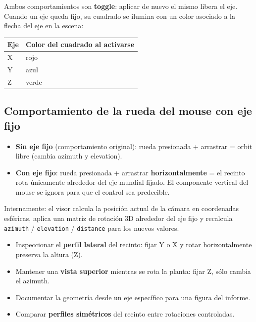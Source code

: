 \documentclass[11pt, a4paper]{article}
\newenvironment{consejo}[1][Consejo]{%
  \begin{tcolorbox}[mybox=cTeal, title={#1}]%
}{\end{tcolorbox}}
\begin{document}
Ambos comportamientos son \textbf{toggle}: aplicar de nuevo el mismo
libera el eje. Cuando un eje queda fijo, su cuadrado se ilumina con un
color asociado a la flecha del eje en la escena:

\vspace{0.3em}
\begin{tabular}{ll}
  \toprule
  \textbf{Eje} & \textbf{Color del cuadrado al activarse} \\
  \midrule
  X & rojo  \\
  Y & azul  \\
  Z & verde \\
  \bottomrule
\end{tabular}

\subsection{Comportamiento de la rueda del mouse con eje fijo}

\begin{itemize}[itemsep=2pt]
  \item \textbf{Sin eje fijo} (comportamiento original): rueda presionada
        + arrastrar = orbit libre (cambia azimuth y elevation).
  \item \textbf{Con eje fijo}: rueda presionada + arrastrar
        \textbf{horizontalmente} = el recinto rota únicamente alrededor
        del eje mundial fijado. El componente vertical del mouse se
        ignora para que el control sea predecible.
\end{itemize}

Internamente: el visor calcula la posición actual de la cámara en
coordenadas esféricas, aplica una matriz de rotación 3D alrededor del
eje fijo y recalcula \texttt{azimuth} / \texttt{elevation} /
\texttt{distance} para los nuevos valores.

\begin{consejo}[Cuándo usar esta función]
\begin{itemize}[itemsep=2pt]
  \item Inspeccionar el \textbf{perfil lateral} del recinto: fijar Y o X
        y rotar horizontalmente preserva la altura (Z).
  \item Mantener una \textbf{vista superior} mientras se rota la planta:
        fijar Z, sólo cambia el azimuth.
  \item Documentar la geometría desde un eje específico para una figura
        del informe.
  \item Comparar \textbf{perfiles simétricos} del recinto entre
        rotaciones controladas.
\end{itemize}
\end{consejo}
\end{document}
